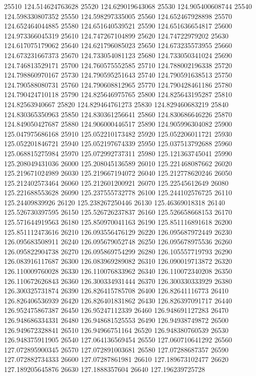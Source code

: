 {25510 124.514624763628
25520 124.629019643068
25530 124.905400608744
25540 124.598330807352
25550 124.598297335005
25560 124.652467928898
25570 124.652464044885
25580 124.651640539521
25590 124.651636654817
25600 124.973366045319
25610 124.747267104899
25620 124.74722979202
25630 124.617075179062
25640 124.621796085023
25650 124.673235573955
25660 124.673231667373
25670 124.733054081123
25680 124.733050341024
25690 124.746813529171
25700 124.760575552585
25710 124.788002196338
25720 124.798860970167
25730 124.790595251643
25740 124.790591638513
25750 124.790588080731
25760 124.790608812965
25770 124.790428461186
25780 124.790424710118
25790 124.825646975765
25800 124.825643195287
25810 124.82563940667
25820 124.829464761273
25830 124.829460683219
25840 124.830365350963
25850 124.830361256641
25860 124.830686646226
25870 124.849050427687
25880 124.906000446517
25890 124.905996304082
25900 125.047975686168
25910 125.052210173482
25920 125.052206011721
25930 125.052201846721
25940 125.052197674339
25950 125.037513792688
25960 125.068815275984
25970 125.072992737311
25980 125.121363745041
25990 125.208049431036
26000 125.208045136589
26010 125.221468087662
26020 125.219671024989
26030 125.219667194072
26040 125.212778620246
26050 125.212402573464
26060 125.212601200921
26070 125.22545612649
26080 125.221688553628
26090 125.237555732778
26100 125.244102576725
26110 125.24409839926
26120 125.238267250446
26130 125.46369018318
26140 125.526730397595
26150 125.526726237837
26160 125.526658668153
26170 125.571644919563
26180 125.850970041163
26190 125.851116891618
26200 125.851112473616
26210 126.093556476129
26220 126.095687972449
26230 126.095683508911
26240 126.095679052748
26250 126.095678975536
26260 126.095822904738
26270 126.095869754299
26280 126.105557719793
26290 126.083916117687
26300 126.083969289082
26310 126.090019713872
26320 126.110009760028
26330 126.110076833962
26340 126.110072340208
26350 126.110672626843
26360 126.300334931444
26370 126.300330333929
26380 126.300325731874
26390 126.826415785708
26400 126.82641116773
26410 126.826406536939
26420 126.826401831862
26430 126.826397091717
26440 126.952475867387
26450 126.95247112339
26460 126.948691127283
26470 126.948686334331
26480 126.948681525553
26490 126.94938749872
26500 126.949672328841
26510 126.94966751164
26520 126.948380760539
26530 126.948375911905
26540 127.064136569454
26550 127.060710641292
26560 127.072895900345
26570 127.072891003681
26580 127.07288687357
26590 127.072882734333
26600 127.07287861981
26610 127.189673102477
26620 127.189205645876
26630 127.1888357604
26640 127.196239725728
}

